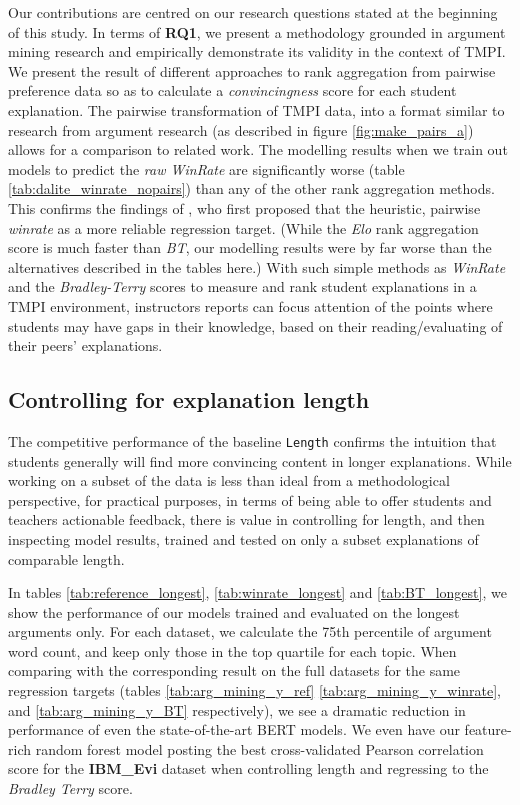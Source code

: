 \documentclass[notitlepage,12pt]{jedm}
\begin{document}
Our contributions are centred on our research questions stated at the beginning 
of this study. 
In terms of \textbf{RQ1}, we present a methodology grounded in argument mining 
research and empirically demonstrate its validity in the context of TMPI.
We present the result of different approaches to rank aggregation from pairwise 
preference data so as to calculate a \textit{convincingness} score for each 
student explanation.
The pairwise transformation of TMPI data, into a format similar to research 
from argument research (as described in figure \ref{fig:make_pairs_a}) allows 
for a comparison to related work. 
The modelling results when we train out models to predict the \textit{raw 
WinRate} are significantly worse (table \ref{tab:dalite_winrate_nopairs}) than 
any of the other rank aggregation methods.
This confirms the findings of \cite{potash_ranking_2019}, who first proposed 
that the heuristic, pairwise \textit{winrate} as a more reliable regression 
target.
(While the \textit{Elo} rank aggregation score is much faster than \textit{BT}, 
our modelling results were by far worse than the alternatives described in the 
tables here.)
With such simple methods as \textit{WinRate} and the \textit{Bradley-Terry} 
scores to measure and rank student explanations in a TMPI environment, 
instructors reports can focus attention of the points where students may have 
gaps in their knowledge, based on their reading/evaluating of their peers' 
explanations.


\subsection{Controlling for explanation length}

The competitive performance of the baseline \verb|Length| confirms the 
intuition that students generally will find more convincing content in longer 
explanations.
While working on a subset of the data is less than ideal from a methodological 
perspective, for practical purposes, in terms of being able to offer students 
and teachers actionable feedback, there is value in controlling for length, and 
then inspecting model results, trained and tested on only a subset explanations 
of comparable length.

In tables \ref{tab:reference_longest}, \ref{tab:winrate_longest} and 
\ref{tab:BT_longest}, we show the performance of our models trained and 
evaluated on the longest arguments only. 
For each dataset, we calculate the 75th percentile of argument word count, and 
keep only those in the top quartile for each topic.
When comparing with the corresponding result on the full datasets for the same 
regression targets (tables \ref{tab:arg_mining_y_ref} 
\ref{tab:arg_mining_y_winrate}, and \ref{tab:arg_mining_y_BT} respectively), we 
see a dramatic reduction in performance of even the state-of-the-art BERT 
models.
We even have our feature-rich random forest model posting the best 
cross-validated Pearson correlation score for the \textbf{IBM\_Evi} dataset 
when controlling length and regressing to the \textit{Bradley Terry} score.
\end{document}
